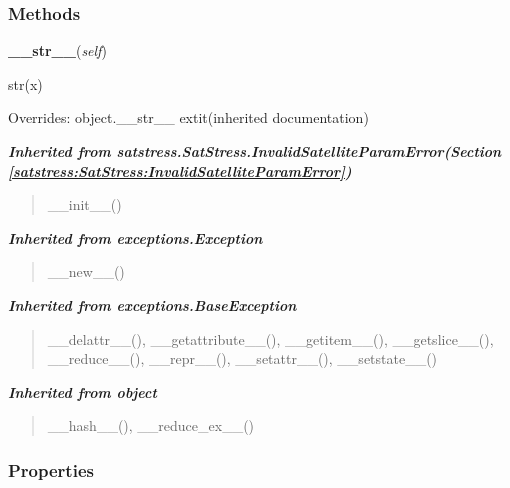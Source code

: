   \subsubsection{Methods}

    \vspace{0.5ex}

\hspace{.8\funcindent}\begin{boxedminipage}{\funcwidth}

    \raggedright \textbf{\_\_str\_\_}(\textit{self})

\setlength{\parskip}{2ex}
    str(x)

\setlength{\parskip}{1ex}
      Overrides: object.\_\_str\_\_ 	extit{(inherited documentation)}

    \end{boxedminipage}


\large{\textbf{\textit{Inherited from satstress.SatStress.InvalidSatelliteParamError\textit{(Section \ref{satstress:SatStress:InvalidSatelliteParamError})}}}}

\begin{quote}
\_\_init\_\_()
\end{quote}

\large{\textbf{\textit{Inherited from exceptions.Exception}}}

\begin{quote}
\_\_new\_\_()
\end{quote}

\large{\textbf{\textit{Inherited from exceptions.BaseException}}}

\begin{quote}
\_\_delattr\_\_(), \_\_getattribute\_\_(), \_\_getitem\_\_(), \_\_getslice\_\_(), \_\_reduce\_\_(), \_\_repr\_\_(), \_\_setattr\_\_(), \_\_setstate\_\_()
\end{quote}

\large{\textbf{\textit{Inherited from object}}}

\begin{quote}
\_\_hash\_\_(), \_\_reduce\_ex\_\_()
\end{quote}


  \subsubsection{Properties}

